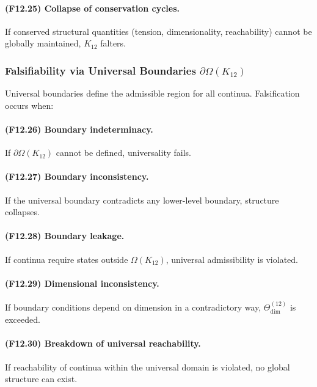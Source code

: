 \paragraph{(F12.25) Collapse of conservation cycles.}
If conserved structural quantities (tension, dimensionality, reachability)
cannot be globally maintained, $K_{12}$ falters.



\subsubsection{Falsifiability via Universal Boundaries $\partial\Omega(K_{12})$}

Universal boundaries define the admissible region for all continua.
Falsification occurs when:

\paragraph{(F12.26) Boundary indeterminacy.}
If $\partial\Omega(K_{12})$ cannot be defined, universality fails.

\paragraph{(F12.27) Boundary inconsistency.}
If the universal boundary contradicts any lower-level boundary,
structure collapses.

\paragraph{(F12.28) Boundary leakage.}
If continua require states outside $\Omega(K_{12})$,  
universal admissibility is violated.

\paragraph{(F12.29) Dimensional inconsistency.}
If boundary conditions depend on dimension in a contradictory way,
$\Theta_{\mathrm{dim}}^{(12)}$ is exceeded.

\paragraph{(F12.30) Breakdown of universal reachability.}
If reachability of continua within the universal domain is violated,
no global structure can exist.



